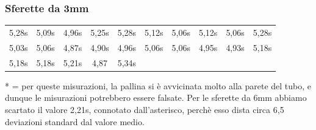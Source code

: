 \subsubsection{Sferette da 3mm}

\begin{tabular}{c|c|c|c|c|c|c|c|c|c}
\toprule
 5,28s & 5,09s & 4,96s & 5,25s & 5,28s & 5,12s & 5,06s & 5,12s & 5,06s & 5,28s \\
 5,03s & 5,06s & 4,87s & 4,90s & 4,96s & 5,06s & 5,06s & 4,95s & 4,93s & 5,18s \\
 5,18s & 5,18s & 5,21s & 4,87 & 5,34s &  &  &  &  & \\
\bottomrule
\end{tabular}

* = per queste misurazioni, la pallina si è avvicinata molto alla parete del tubo, e dunque le misurazioni potrebbero essere falsate.
Per le sferette da 6mm abbiamo scartato il valore 2,21s, connotato dall'asterisco, perchè esso dista circa 6,5 deviazioni standard dal valore medio.

